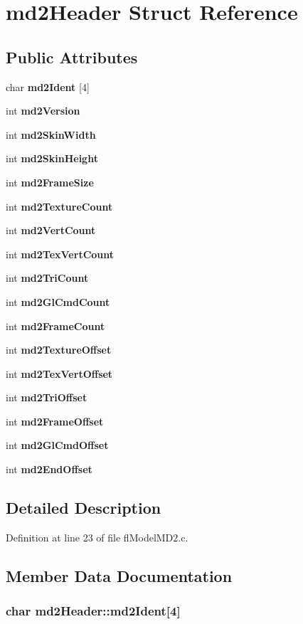 \section{md2Header Struct Reference}
\label{structmd2Header}
\subsection*{Public Attributes}
\begin{CompactItemize}
\item 
char {\bf md2Ident} [4]
\item 
int {\bf md2Version}
\item 
int {\bf md2Skin\-Width}
\item 
int {\bf md2Skin\-Height}
\item 
int {\bf md2Frame\-Size}
\item 
int {\bf md2Texture\-Count}
\item 
int {\bf md2Vert\-Count}
\item 
int {\bf md2Tex\-Vert\-Count}
\item 
int {\bf md2Tri\-Count}
\item 
int {\bf md2Gl\-Cmd\-Count}
\item 
int {\bf md2Frame\-Count}
\item 
int {\bf md2Texture\-Offset}
\item 
int {\bf md2Tex\-Vert\-Offset}
\item 
int {\bf md2Tri\-Offset}
\item 
int {\bf md2Frame\-Offset}
\item 
int {\bf md2Gl\-Cmd\-Offset}
\item 
int {\bf md2End\-Offset}
\end{CompactItemize}


\subsection{Detailed Description}




Definition at line 23 of file fl\-Model\-MD2.c.

\subsection{Member Data Documentation}
\subsubsection{\setlength{\rightskip}{0pt plus 5cm}char {\bf md2Header::md2Ident}[4]}\label{structmd2Header_2eb047b0cd6f016773f42c022389cffc}




